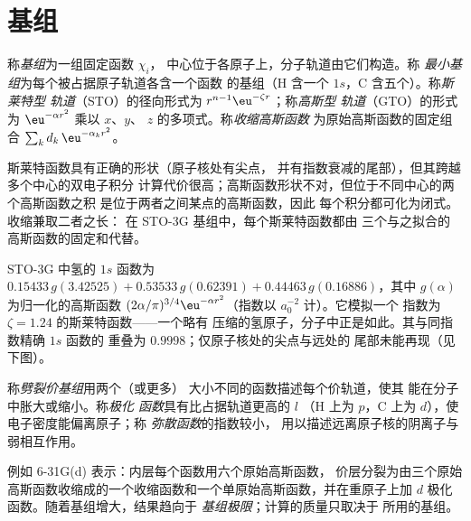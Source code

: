 \section{基组}

\begin{definition}\label{def:b3:computational-chemistry:basis}
称\emph{基组}为一组固定函数 $\chi_i$，
中心位于各原子上，分子轨道由它们构造。称
\emph{最小基组}为每个被占据原子轨道各含一个函数
的基组（H 含一个 $1s$，C 含五个）。称\emph{斯莱特型
轨道}（STO）的径向形式为
$r^{n-1}\eu^{-\zeta r}$；称\emph{高斯型
轨道}（GTO）的形式为 $\eu^{-\alpha r^2}$ 乘以 $x$、$y$、
$z$ 的多项式。称\emph{收缩高斯函数}
为原始高斯函数的固定组合 $\sum_kd_k\,\eu^{-\alpha_kr^2}$。
\end{definition}

斯莱特函数具有正确的形状（原子核处有尖点，
并有指数衰减的尾部），但其跨越多个中心的双电子积分
计算代价很高；高斯函数形状不对，但位于不同中心的两个高斯函数之积
是位于两者之间某点的高斯函数，因此
每个积分都可化为闭式。收缩兼取二者之长：
在 STO-3G 基组中，每个斯莱特函数都由
三个与之拟合的高斯函数的固定和代替。

\begin{example}[氢的 STO-3G 函数]\label{ex:b3:computational-chemistry:sto3g}
STO-3G 中氢的 $1s$ 函数为 $0.15433\,g(3.42525) + 0.53533\,
g(0.62391) + 0.44463\,g(0.16886)$，其中 $g(\alpha)$ 为归一化的高斯函数
$(2\alpha/\pi)^{3/4}\eu^{-\alpha r^2}$（指数以 $a_0^{-2}$ 计）。它模拟一个
指数为 $\zeta = 1.24$ 的斯莱特函数——一个略有
压缩的氢原子，分子中正是如此。其与同指数精确 $1s$ 函数的
重叠为 $0.9998$；仅原子核处的尖点与远处的
尾部未能再现（见下图）。
\end{example}

\begin{definition}\label{def:b3:computational-chemistry:split-valence}
称\emph{劈裂价基组}用两个（或更多）
大小不同的函数描述每个价轨道，使其
能在分子中胀大或缩小。称\emph{极化
函数}具有比占据轨道更高的 $l$
（H 上为 $p$，C 上为 $d$），使电子密度能偏离原子；称
\emph{弥散函数}的指数较小，
用以描述远离原子核的阴离子与弱相互作用。
\end{definition}

例如 6-31G(d) 表示：内层每个函数用六个原始高斯函数，
价层分裂为由三个原始高斯函数收缩成的一个收缩函数和一个单原始高斯函数，并在重原子上加 $d$
极化函数。随着基组增大，结果趋向于
\emph{基组极限}；计算的质量只取决于
所用的基组。

